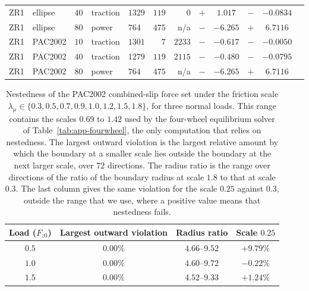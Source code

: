 \documentclass[12pt, twoside]{amsart}
\theoremstyle{definition}
\begin{document}
\begin{table}[htbp]
\begin{tabular}{lllllrrrcrcr}
ZR1 & ellipse & $40$ & traction & $1329$ & $119$ & $0$ & $+$ & $1.017$ & $-$ & $-0.0834$\\
ZR1 & ellipse & $80$ & power & $764$ & $475$ & n/a & $-$ & $-6.265$ & $+$ & $6.7116$\\
ZR1 & PAC2002 & $10$ & traction & $1301$ & $7$ & $2233$ & $-$ & $-0.617$ & $-$ & $-0.0050$\\
ZR1 & PAC2002 & $40$ & traction & $1279$ & $119$ & $2115$ & $-$ & $-0.480$ & $-$ & $-0.0795$\\
ZR1 & PAC2002 & $80$ & power & $764$ & $475$ & n/a & $-$ & $-6.265$ & $+$ & $6.7116$\\
\bottomrule
\end{tabular}
\end{table}
\begin{table}[htbp]
\centering\small
\caption{Nestedness of the PAC2002 combined-slip force set under the friction scale $\lambda_\mu\in\{0.3,0.5,0.7,0.9,1.0,1.2,1.5,1.8\}$, for three normal loads. This range contains the scales $0.69$ to $1.42$ used by the four-wheel equilibrium solver of Table~\ref{tab:app-fourwheel}, the only computation that relies on nestedness. The largest outward violation is the largest relative amount by which the boundary at a smaller scale lies outside the boundary at the next larger scale, over $72$ directions. The radius ratio is the range over directions of the ratio of the boundary radius at scale $1.8$ to that at scale $0.3$. The last column gives the same violation for the scale $0.25$ against $0.3$, outside the range that we use, where a positive value means that nestedness fails.}\label{tab:app-nest}
\begin{tabular}{cccc}
\toprule
Load ($F_{z0}$) & Largest outward violation & Radius ratio & Scale $0.25$\\
\midrule
$0.5$ & $0.00\%$ & $4.66$--$9.52$ & $+9.79\%$\\
$1.0$ & $0.00\%$ & $4.60$--$9.72$ & $-0.22\%$\\
$1.5$ & $0.00\%$ & $4.52$--$9.33$ & $+1.24\%$\\
\bottomrule
\end{tabular}
\end{table}
\end{document}
